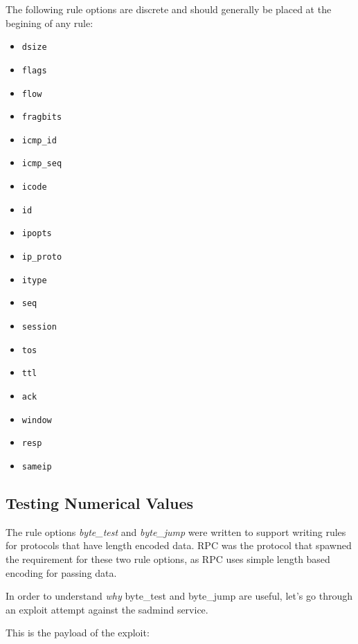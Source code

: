 \documentclass[english]{report}
\begin{document}
The following rule options are discrete and should generally be placed at the
begining of any rule:

\begin{itemize}
\item \texttt{dsize}
\item \texttt{flags}
\item \texttt{flow}
\item \texttt{fragbits}
\item \texttt{icmp\_id}
\item \texttt{icmp\_seq} 
\item \texttt{icode} 
\item \texttt{id}
\item \texttt{ipopts}
\item \texttt{ip\_proto} 
\item \texttt{itype} 
\item \texttt{seq}
\item \texttt{session} 
\item \texttt{tos}
\item \texttt{ttl}
\item \texttt{ack}
\item \texttt{window}
\item \texttt{resp} 
\item \texttt{sameip}
\end{itemize}

\subsection{Testing Numerical Values \label{testing numerical values}}
The rule options \emph{byte\_test} and \emph{byte\_jump} were written to
support writing rules for protocols that have length encoded data.  RPC was the 
protocol that spawned the requirement for these two rule options, as RPC uses simple 
length based encoding for passing data.

In order to understand \emph{why} byte\_test and byte\_jump are useful, let's go
through an exploit attempt against the sadmind service.

This is the payload of the exploit:
\end{document}
